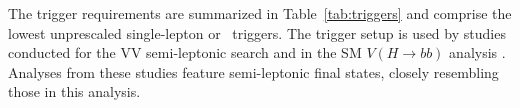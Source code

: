 




The trigger requirements are summarized in Table~\ref{tab:triggers} and comprise the lowest unprescaled single-lepton or \met\ triggers. The trigger setup is used by studies conducted for the VV semi-leptonic search  \cite{Bachas:2646593}
and in the SM $V\left(H\to bb\right)$ analysis \cite{HIGG-2018-04, ATL-COM-PHYS-2018-517}. Analyses from these studies feature semi-leptonic final states, closely resembling those in this analysis.

